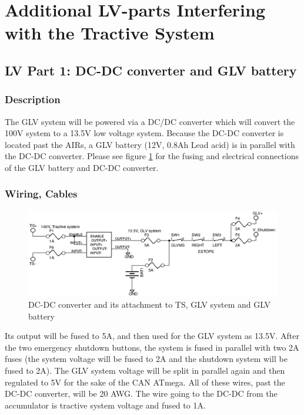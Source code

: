 \documentclass{article}
\begin{document}
\newpage

\section{Additional LV-parts Interfering with the Tractive System}

    \subsection{LV Part 1: DC-DC converter and GLV battery}

        \subsubsection{Description}


            The GLV system will be powered via a DC/DC converter which will convert the 100V system to a 13.5V low voltage system. Because the DC-DC converter is located past the AIRs, a GLV battery (12V, 0.8Ah Lead acid) is in parallel with the DC-DC converter. Please see figure \ref{glvfusing} for the fusing and electrical connections of the GLV battery and DC-DC converter.


        \subsubsection{Wiring, Cables}

            \begin{figure}[H]
                \centering
                \includegraphics{glvfusing}
                \caption{DC-DC converter and its attachment to TS, GLV system and GLV battery}
                \label{glvfusing}
            \end{figure}


            Its output will be fused to 5A, and then used for the GLV system as 13.5V. After the two emergency shutdown buttons, the system is fused in parallel with two 2A fuses (the system voltage will be fused to 2A and the shutdown system will be fused to 2A). The GLV system voltage will be split in parallel again and then regulated to 5V for the sake of the CAN ATmega. All of these wires, past the DC-DC converter, will be 20 AWG. The wire going to the DC-DC from the accumulator is tractive system voltage and fused to 1A.
\end{document}
